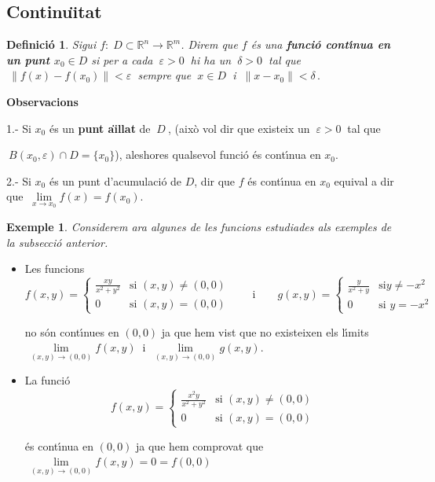 \documentclass[12pt]{article}
\newcommand{\observacions}{\textbf{Observacions}\ \ }
\newtheorem{definicio}{Definici{\'o}}[subsection]
\newtheorem{exemple}{Exemple}[subsection]
\newcommand{\R}{\mathbb{R}}
\begin{document}
\subsection{Continu{\"\i}tat}

\begin{definicio}
Sigui $f:\; D\subset \R^n \longrightarrow \R^m$. Direm que $f$
{\'e}s una \textbf{funci{\'o} cont{\'\i}nua en un punt $x_0\in D$} si per a
cada $\ \varepsilon > 0\ $ hi ha un $\ \delta > 0\ $ tal que $\ \| f(x) -
f(x_0) \| < \varepsilon\ $ sempre que $\ x\in D\ $ i $\ \| x - x_0\| <
\delta\,.$
\end{definicio}


\vspace{0.4cm}
\observacions
$\ $

1.- Si $x_0$ {\'e}s un \textbf{punt a{\"\i}llat} de $\ D\ $, (aix{\`o} vol dir que existeix un
$\ \varepsilon > 0\ $ tal que

 $\ B(x_0,\varepsilon)\cap D =\{x_0 \}$), aleshores qualsevol funci{\'o} {\'e}s
cont{\'\i}nua  en $x_0$.

\vspace{0.3cm}
2.- Si $x_0$ {\'e}s un punt d'acumulaci{\'o} de $D$, dir que $f$ {\'e}s cont{\'\i}nua en $x_0$
equival a dir que $\ \lim\limits_{x\to x_0} f(x) = f(x_0)$.

\vspace{0.4cm}
\begin{exemple}
Considerem ara algunes de les funcions estudiades als exemples de
la subsecci{\'o} anterior.
\end{exemple}

\begin{itemize}
  \item[1.-] Les funcions
  \[
f(x,y)=\begin{cases} \frac{xy}{x^2+y^2} & \text{si $(x,y)\not=
(0,0)$}\\ 0 & \text{si $(x,y)=(0,0)$} \end{cases} \qquad
\mbox{i}\qquad g(x,y)=\begin{cases} \frac{y}{x^2+y} & \text{si
$y\not= -x^2$}\\ 0 & \text{si $y=-x^2$}\end{cases}
  \]

  no s{\'o}n cont{\'\i}nues en $(0,0)$ ja que hem vist que no
  existeixen els l{\'\i}mits $\ \lim\limits_{(x,y)\to (0,0)} f(x,y)\ $
  i $\ \lim\limits_{(x,y)\to (0,0)} g(x,y)$.

  \item[2.-] La funci{\'o}
$$
f(x,y)=\begin{cases} \frac{x^2 y}{x^2+y^2} & \text{si $(x,y)\not=
(0,0)$}\\ 0 & \text{si $(x,y)=(0,0)$}
\end{cases}$$


{\'e}s cont{\'\i}nua en $(0,0)$ ja que hem comprovat que\\

 \hspace{2cm}$\ \lim\limits_{(x,y)\to (0,0)} f(x,y)=0=f(0,0)$
\end{itemize}
\end{document}
